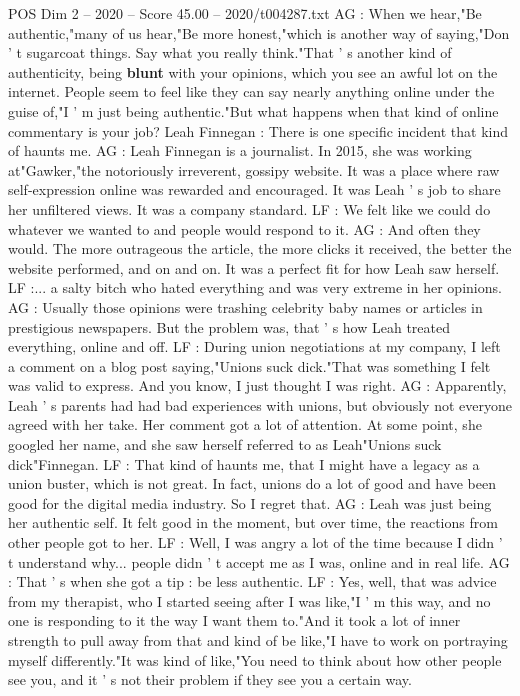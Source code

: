 \begin{textsample}{POS Dim 2 – 2020 – Score 45.00 – 2020/t004287.txt}
AG : When we hear,"Be authentic,"many of us hear,"Be more honest,"which is another way of saying,"Don ' t sugarcoat things.
Say what you really think."That ' s another kind of authenticity, being \textbf{blunt} with your opinions, which you see an awful lot on the internet.
People seem to feel like they can say nearly anything online under the guise of,"I ' m just being authentic."But what happens when that kind of online commentary is your job?
Leah Finnegan : There is one specific incident that kind of haunts me.
AG : Leah Finnegan is a journalist.
In 2015, she was working at"Gawker,"the notoriously irreverent, gossipy website.
It was a place where raw self-expression online was rewarded and encouraged.
It was Leah ' s job to share her unfiltered views.
It was a company standard.
LF : We felt like we could do whatever we wanted to and people would respond to it.
AG : And often they would.
The more outrageous the article, the more clicks it received, the better the website performed, and on and on.
It was a perfect fit for how Leah saw herself.
LF :... a salty bitch who hated everything and was very extreme in her opinions.
AG : Usually those opinions were trashing celebrity baby names or articles in prestigious newspapers.
But the problem was, that ' s how Leah treated everything, online and off.
LF : During union negotiations at my company, I left a comment on a blog post saying,"Unions suck dick."That was something I felt was valid to express.
And you know, I just thought I was right.
AG : Apparently, Leah ' s parents had had bad experiences with unions, but obviously not everyone agreed with her take.
Her comment got a lot of attention.
At some point, she googled her name, and she saw herself referred to as Leah"Unions suck dick"Finnegan.
LF : That kind of haunts me, that I might have a legacy as a union buster, which is not great.
In fact, unions do a lot of good and have been good for the digital media industry.
So I regret that.
AG : Leah was just being her authentic self.
It felt good in the moment, but over time, the reactions from other people got to her.
LF : Well, I was angry a lot of the time because I didn ' t understand why... people didn ' t accept me as I was, online and in real life.
AG : That ' s when she got a tip : be less authentic.
LF : Yes, well, that was advice from my therapist, who I started seeing after I was like,"I ' m this way, and no one is responding to it the way I want them to."And it took a lot of inner strength to pull away from that and kind of be like,"I have to work on portraying myself differently."It was kind of like,"You need to think about how other people see you, and it ' s not their problem if they see you a certain way.

\end{textsample}
